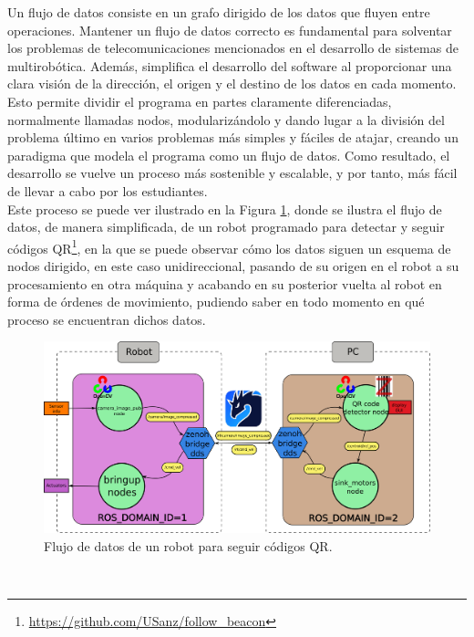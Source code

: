 Un flujo de datos consiste en un grafo dirigido de los datos que fluyen entre
operaciones.
Mantener un flujo de datos correcto es fundamental para solventar los problemas
de telecomunicaciones mencionados en el desarrollo de sistemas de multirobótica.
Además, simplifica el desarrollo del software al proporcionar una clara visión
de la dirección, el origen y el destino de los datos en cada momento.
Esto permite dividir el programa en partes claramente diferenciadas, normalmente
llamadas nodos, modularizándolo y dando lugar a la división del problema último
en varios problemas más simples y fáciles de atajar, creando un paradigma que
modela el programa como un flujo de datos.
Como resultado, el desarrollo se vuelve un proceso más sostenible y escalable, y
por tanto, más fácil de llevar a cabo por los estudiantes.
\\

Este proceso se puede ver ilustrado en la Figura \ref{fig:data_flow_qr_example},
donde se ilustra el flujo de datos, de manera simplificada, de un robot
programado para detectar y seguir códigos
QR\footnote{\url{https://github.com/USanz/follow_beacon}}, en la que se puede
observar cómo los datos siguen un esquema de nodos dirigido, en este caso
unidireccional, pasando de su origen en el robot a su procesamiento en otra
máquina y acabando en su posterior vuelta al robot en forma de órdenes de
movimiento, pudiendo saber en todo momento en qué proceso se encuentran dichos
datos.

\begin{figure} [h!]
  \begin{center}
    \includegraphics[width=15cm]{figs/QR_code_data_flow}
  \end{center}
  \caption{Flujo de datos de un robot para seguir códigos QR.}
  \label{fig:data_flow_qr_example}
\end{figure}\


